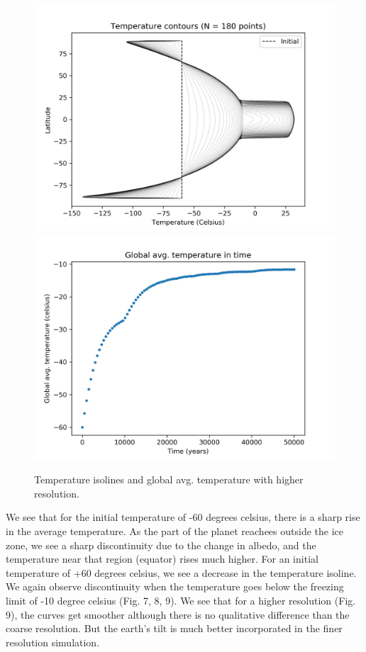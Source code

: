 \documentclass{article}
\begin{document}
\begin{figure}
\includegraphics[scale=0.7]{tcont_q4b.png} 
\includegraphics[scale=0.7]{tavg_q4b.png}
\caption{Temperature isolines and global avg. temperature with higher resolution.}
\end{figure}

We see that for the initial temperature of -60 degrees celsius, there is a sharp rise in the average temperature. As the part of the planet reachees outside the ice zone, we see a sharp discontinuity due to the change in albedo, and the temperature near that region (equator) rises much higher. For an initial temperature of +60 degrees celsius, we see a decrease in the temperature isoline. We again observe discontinuity when the temperature goes below the freezing limit of -10 degree celsius (Fig. 7, 8, 9). We see that for a higher resolution (Fig. 9), the curves get smoother although there is no qualitative difference than the coarse resolution. But the earth's tilt is much better incorporated in the finer resolution simulation. 
\end{document}
